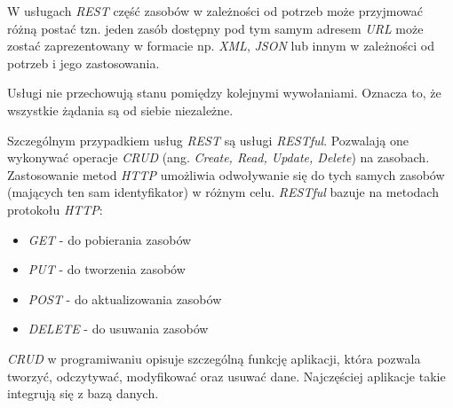 W usługach \textsl{REST} część zasobów w zależności od potrzeb może przyjmować różną postać tzn. jeden zasób dostępny pod tym samym adresem \textsl{URL} może zostać zaprezentowany w formacie np. \textsl{XML}, \textsl{JSON} lub innym w zależności od potrzeb i jego zastosowania.

Usługi nie przechowują stanu pomiędzy kolejnymi wywołaniami. Oznacza to, że wszystkie żądania są od siebie niezależne.

Szczególnym przypadkiem usług \textsl{REST} są usługi \textsl{RESTful}. Pozwalają one wykonywać operacje \textsl{CRUD} (ang. \textsl{Create, Read, Update, Delete}) na zasobach. Zastosowanie metod \textsl{HTTP} umożliwia odwoływanie się do tych samych zasobów (mających ten sam identyfikator) w różnym celu. \textsl{RESTful} bazuje na metodach protokołu \textsl{HTTP}:
\begin{itemize}
    \item \textsl{GET} - do pobierania zasobów
    \item \textsl{PUT} - do tworzenia zasobów
    \item \textsl{POST} - do aktualizowania zasobów
    \item \textsl{DELETE} - do usuwania zasobów
\end{itemize} 

\textsl{CRUD} w programiwaniu opisuje szczególną funkcję aplikacji, która pozwala tworzyć, odczytywać, modyfikować oraz usuwać dane. Najczęściej aplikacje takie integrują się z bazą danych. 
